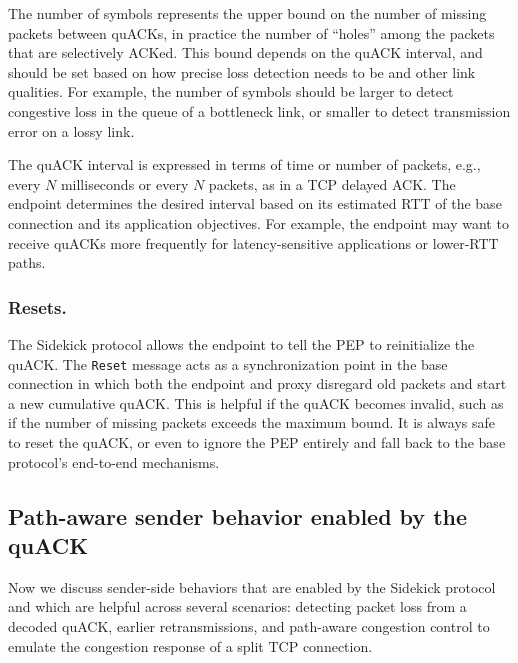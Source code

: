 The number of symbols represents the upper bound on the number of missing
packets between quACKs, in practice the number of ``holes'' among the packets
that are selectively ACKed. This bound depends on the quACK interval, and
should be set based on how precise loss detection needs to be and other
link qualities. For example, the number of symbols should be larger to
detect congestive loss in the queue of a bottleneck link, or smaller to detect
transmission error on a lossy link.

The quACK interval is expressed in terms of time or number of packets,
 e.g., every $N$ milliseconds or every $N$ packets, as in a TCP delayed ACK.
The endpoint determines the desired interval based on its estimated
RTT of the base connection and its application objectives. For example, the
endpoint may want to receive quACKs more frequently for latency-sensitive
applications or lower-RTT paths.

\subsubsection{Resets.}
The Sidekick protocol allows the endpoint to tell the PEP to reinitialize the
quACK. The \texttt{Reset} message acts as a synchronization point in the base
connection in which both the endpoint and proxy disregard old packets and start
a new cumulative quACK. This is helpful if the quACK becomes invalid, such as
if the number of missing packets exceeds the maximum bound. It is always safe
to reset the quACK, or even to ignore the PEP entirely and fall back to the
base protocol's end-to-end mechanisms.


\subsection{Path-aware sender behavior enabled by the quACK}
\label{sec:sidekick:design:sender}

Now we discuss sender-side behaviors that are enabled by the
Sidekick protocol and which are helpful across several scenarios: detecting
packet loss from a decoded quACK, earlier retransmissions, and path-aware
congestion control to emulate the congestion response of a split TCP connection.

